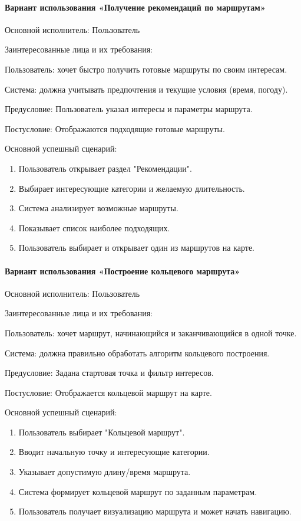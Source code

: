 \paragraph{Вариант использования «Получение рекомендаций по маршрутам»}

Основной исполнитель: Пользователь

Заинтересованные лица и их требования:

Пользователь: хочет быстро получить готовые маршруты по своим интересам.

Система: должна учитывать предпочтения и текущие условия (время, погоду).

Предусловие: Пользователь указал интересы и параметры маршрута.

Постусловие: Отображаются подходящие готовые маршруты.

Основной успешный сценарий:
\begin{enumerate}
	\item Пользователь открывает раздел "Рекомендации".
	\item Выбирает интересующие категории и желаемую длительность.
	\item Система анализирует возможные маршруты.
	\item Показывает список наиболее подходящих.
	\item Пользователь выбирает и открывает один из маршрутов на карте.
\end{enumerate}

\paragraph{Вариант использования «Построение кольцевого маршрута»}

Основной исполнитель: Пользователь

Заинтересованные лица и их требования:

Пользователь: хочет маршрут, начинающийся и заканчивающийся в одной точке.

Система: должна правильно обработать алгоритм кольцевого построения.

Предусловие: Задана стартовая точка и фильтр интересов.

Постусловие: Отображается кольцевой маршрут на карте.

Основной успешный сценарий:
\begin{enumerate}
	\item Пользователь выбирает "Кольцевой маршрут".
	\item Вводит начальную точку и интересующие категории.
	\item Указывает допустимую длину/время маршрута.
	\item Система формирует кольцевой маршрут по заданным параметрам.
	\item Пользователь получает визуализацию маршрута и может начать навигацию.
\end{enumerate}

